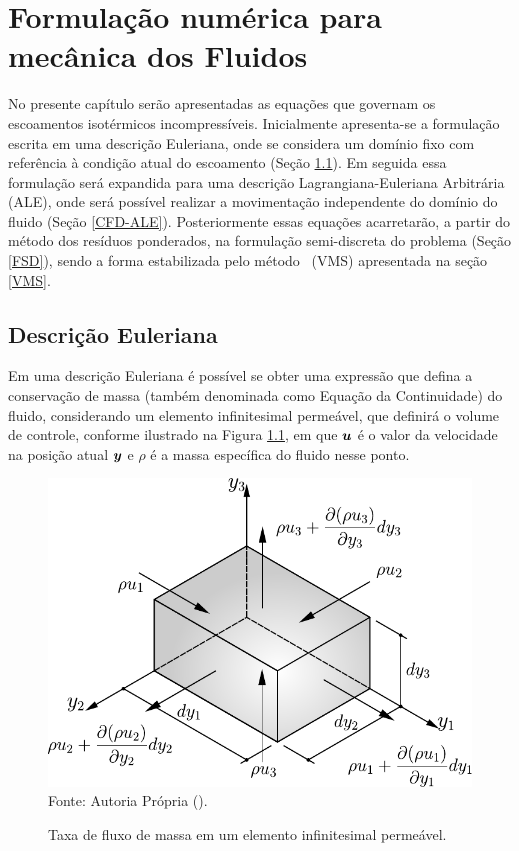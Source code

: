 \chapter{Formulação numérica para mecânica dos Fluidos} \label{EGDF}

No presente capítulo serão apresentadas as equações que governam os escoamentos isotérmicos incompressíveis. Inicialmente apresenta-se a formulação escrita em uma descrição Euleriana, onde se considera um domínio fixo com referência à condição atual do escoamento (Seção \ref{CFD-E}). Em seguida essa formulação será expandida para uma descrição Lagrangiana-Euleriana Arbitrária (ALE), onde será possível realizar a movimentação independente do domínio do fluido (Seção \ref{CFD-ALE}). Posteriormente essas equações acarretarão, a partir do método dos resíduos ponderados, na formulação semi-discreta do problema (Seção \ref{FSD}), sendo a forma estabilizada pelo método \VMS\ (VMS) apresentada na seção \ref{VMS}.

\section{Descrição Euleriana} \label{CFD-E}

Em uma descrição Euleriana é possível se obter uma expressão que defina a conservação de massa (também denominada como Equação da Continuidade) do fluido, considerando um elemento infinitesimal permeável, que definirá o volume de controle, conforme ilustrado na Figura \ref{fig:BalMas}, em que $\boldsymbol{u}$ é o valor da velocidade na posição atual $\boldsymbol{y}$ e $\rho$ é a massa específica do fluido nesse ponto.

\begin{figure}[h!]
    \centering
    \caption{Taxa de fluxo de massa em um elemento infinitesimal permeável.}
    \includegraphics[width=.5\linewidth]{Figuras/BalMas.pdf}
    \\Fonte: Autoria Própria (\the\year).
    \label{fig:BalMas}
\end{figure}

